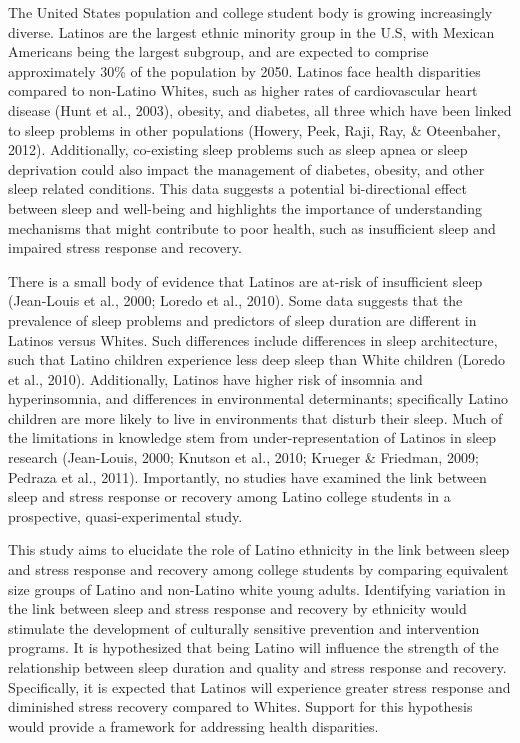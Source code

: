 \documentclass[man]{apa6}
\begin{document}
The United States population and college student body is growing increasingly diverse. Latinos are the largest ethnic minority group in the U.S, with Mexican Americans being the largest subgroup, and are expected to comprise approximately 30\% of the population by 2050. Latinos face health disparities compared to non-Latino Whites, such as higher rates of cardiovascular heart disease (Hunt et al., 2003), obesity, and diabetes, all three which have been linked to sleep problems in other populations (Howery, Peek, Raji, Ray, \& Oteenbaher, 2012). Additionally, co-existing sleep problems such as sleep apnea or sleep deprivation could also impact the management of diabetes, obesity, and other sleep related conditions. This data suggests a potential bi-directional effect between sleep and well-being and highlights the importance of understanding mechanisms that might contribute to poor health, such as insufficient sleep and impaired stress response and recovery.

There is a small body of evidence that Latinos are at-risk of insufficient sleep (Jean-Louis et al., 2000; Loredo et al., 2010). Some data suggests that the prevalence of sleep problems and predictors of sleep duration are different in Latinos versus Whites. Such differences include differences in sleep architecture, such that Latino children experience less deep sleep than White children (Loredo et al., 2010). Additionally, Latinos have higher risk of insomnia and hyperinsomnia, and differences in environmental determinants; specifically Latino children are more likely to live in environments that disturb their sleep. Much of the limitations in knowledge stem from under-representation of Latinos in sleep research (Jean-Louis, 2000; Knutson et al., 2010; Krueger \& Friedman, 2009; Pedraza et al., 2011). Importantly, no studies have examined the link between sleep and stress response or recovery among Latino college students in a prospective, quasi-experimental study.

This study aims to elucidate the role of Latino ethnicity in the link between sleep and stress response and recovery among college students by comparing equivalent size groups of Latino and non-Latino white young adults. Identifying variation in the link between sleep and stress response and recovery by ethnicity would stimulate the development of culturally sensitive prevention and intervention programs. It is hypothesized that being Latino will influence the strength of the relationship between sleep duration and quality and stress response and recovery. Specifically, it is expected that Latinos will experience greater stress response and diminished stress recovery compared to Whites. Support for this hypothesis would provide a framework for addressing health disparities.
\end{document}
